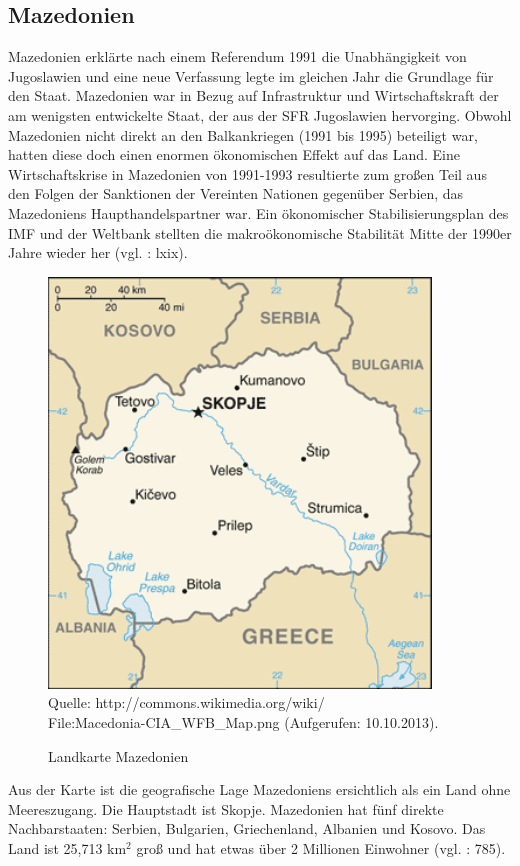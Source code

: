 \subsection{Mazedonien} 
Mazedonien erklärte nach einem Referendum 1991 die Unabhängigkeit von Jugoslawien und eine neue Verfassung legte im gleichen Jahr die Grundlage für den Staat. Mazedonien war in Bezug auf Infrastruktur und Wirtschaftskraft der am wenigsten entwickelte Staat, der aus der SFR Jugoslawien hervorging. Obwohl Mazedonien nicht direkt an den Balkankriegen (1991 bis 1995) beteiligt war, hatten diese doch einen enormen ökonomischen Effekt auf das Land. Eine Wirtschaftskrise in Mazedonien von 1991-1993 resultierte zum großen Teil aus den Folgen der Sanktionen der Vereinten Nationen gegenüber Serbien, das Mazedoniens Haupthandelspartner war. Ein ökonomischer Stabilisierungsplan des IMF und der Weltbank stellten die makroökonomische Stabilität Mitte der 1990er Jahre wieder her (vgl. \cite{bech09} : lxix). 
\begin{figure}[H]
\setlength\belowcaptionskip{10pt}
 \caption{Landkarte Mazedonien}
  \centering
  \includegraphics[width=4in]{Material/Macedonia-CIA_WFB_Map}\\
 Quelle: http://commons.wikimedia.org/wiki/\\
File:Macedonia-CIA\_WFB\_Map.png (Aufgerufen: 10.10.2013).
\end{figure}

Aus der Karte ist die geografische Lage Mazedoniens ersichtlich als ein Land ohne Meereszugang. Die Hauptstadt ist Skopje. Mazedonien hat fünf direkte Nachbarstaaten: Serbien, Bulgarien, Griechenland, Albanien und Kosovo. Das Land ist 25,713 km$^2$ groß und hat etwas über 2 Millionen Einwohner (vgl. \cite{ramet} : 785). 

